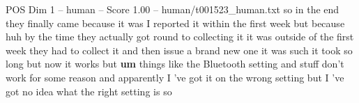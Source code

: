 \begin{textsample}{POS Dim 1 – human – Score 1.00 – human/t001523\_human.txt}  \label{ex:f1_pos_001}
so in the end they finally came because it was I reported it within the first week but because huh by the time they actually got round to collecting it it was outside of the first week they had to collect it and then issue a brand new one it was such it took so long but now it works but \textbf{um} things like the Bluetooth setting and stuff don't work for some reason and apparently I 've got it on the wrong setting but I 've got no idea what the right setting is so

\end{textsample}
